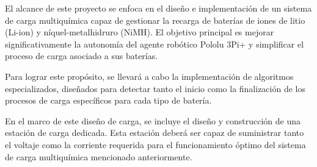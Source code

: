 El alcance de este proyecto se enfoca en el diseño e implementación
de un sistema de carga multiquímica capaz de gestionar la recarga
de baterías de iones de litio (Li-ion) y níquel-metalhidruro (NiMH).
El objetivo principal es mejorar significativamente la autonomía del agente
robótico Pololu 3Pi+ y simplificar el proceso de carga asociado a sus baterías.

Para lograr este propósito, se llevará a cabo la implementación de algoritmos
especializados, diseñados para detectar tanto el inicio como la finalización
de los procesos de carga específicos para cada tipo de batería.

En el marco de este diseño de carga, se incluye el diseño y construcción
de una estación de carga dedicada. Esta estación deberá ser capaz
de suministrar tanto el voltaje como la corriente
requerida para el funcionamiento óptimo del sistema de carga
multiquímica mencionado anteriormente.